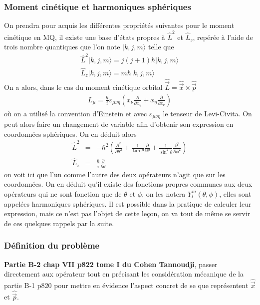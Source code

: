\documentclass[12pt,prb,aps,epsf]{article}
\begin{document}
\subsubsection{Moment cinétique et harmoniques sphériques}
On prendra pour acquis les différentes propriétés suivantes pour le moment cinétique en MQ, il existe une base d'états propres à $\hat{L}^2$ et $\hat{L}_z$, repérée à l'aide de trois nombre quantiques que l'on note $|k,j,m\rangle$ telle que 
\begin{eqnarray}
\hat{L}^2 |k,j,m\rangle = j(j+1)\hbar|k,j,m\rangle\\
\hat{L}_z|k,j,m\rangle = m\hbar|k,j,m\rangle
\end{eqnarray}
On a alors, dans le cas du moment cinétique orbital $\hat{\vec{L}} = \hat{\vec{x}}\times{\hat{\vec{p}}}$
\begin{eqnarray}
L_{\mu} = \frac{\hbar}{i} \varepsilon_{\mu\nu\eta} \left(x_{\nu}\frac{\partial}{\partial x_{\eta}} + x_{\eta}\frac{\partial}{\partial x_{\nu}}\right)
\end{eqnarray}
	où on a utilisé la convention d'Einstein et avec $\varepsilon_{\mu\nu\eta}$ le tenseur de Levi-Civita. On peut alors faire un changement de variable afin d'obtenir son expression en coordonnées sphériques. On en déduit alors 
\begin{eqnarray}
\hat{L}^2 &=& -\hbar^2 \left( \frac{\partial^2}{\partial \theta^2} +\frac{1}{\tan \theta}\frac{\partial}{\partial \theta} + \frac{1}{\sin^2\theta}\frac{\partial^2}{\partial \phi ^2}\right)\\
\hat{L}_z &=& \frac{\hbar}{i}\frac{\partial}{\partial \theta}
\end{eqnarray}
	on voit ici que l'un comme l'autre des deux opérateurs n'agit que sur les coordonnées. On en déduit qu'il existe des fonctions propres communes aux deux opérateurs qui ne sont fonction que de $\theta$ et $\phi$, on les notera $Y_l^m(\theta,\phi)$, elles sont appelées harmoniques sphériques. Il est possible dans la pratique de calculer leur expression, mais ce n'est pas l'objet de cette leçon, on va tout de même se servir de ces quelques rappels par la suite.
	
\subsubsection{Définition du problème}
\textbf{Partie B-2 chap VII p822 tome I du Cohen Tannoudji}, passer directement aux opérateur tout en précisant les considération mécanique de la partie B-1 p820 pour mettre en évidence l'aspect concret de se que représentent $\hat{\vec{x}}$ et $\hat{\vec{p}}$.
\end{document}
